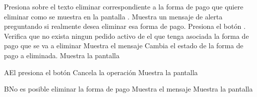 	
	\begin{UCtrayectoria}
		\UCpaso[\UCactor] Presiona sobre el texto eliminar correspondiente a la forma de pago que quiere eliminar como se muestra en la pantalla  .
		\UCpaso Muestra un mensaje de alerta preguntando si realmente desea eliminar esa forma de pago.
		\UCpaso[\UCactor]Presiona el  botón  .
		\UCpaso Verifica que no exista ningun pedido activo de el  que tenga asociada la forma de pago que se va a eliminar
		\UCpaso Muestra el mensaje  
		\UCpaso Cambia el estado de la forma de pago a eliminada.
		\UCpaso Muestra la pantalla  
	\end{UCtrayectoria}
	

	\begin{UCtrayectoriaA}{A}{El  presiona el botón  }
		\UCpaso Cancela la operación
		\UCpaso Muestra la pantalla  
	\end{UCtrayectoriaA}

\begin{UCtrayectoriaA}{B}{No es posible eliminar la forma de pago}
		\UCpaso Muestra el mensaje  
		\UCpaso Muestra la pantalla  
	\end{UCtrayectoriaA}
	